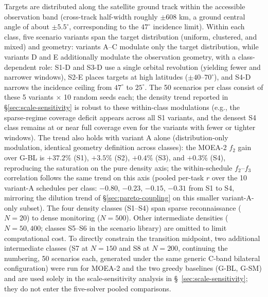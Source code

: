 \documentclass[preprint,12pt,authoryear]{elsarticle}
\begin{document}
Targets are distributed along the satellite ground track within the
accessible observation band (cross-track half-width roughly $\pm 608$ km,
a ground central angle of about $\pm 5.5^\circ$, corresponding to the
$47^\circ$ incidence limit). Within each class, five scenario variants
span the target distribution (uniform, clustered, and mixed) and geometry:
variants A--C modulate only the target distribution, while variants D and E
additionally modulate the observation geometry, with a class-dependent role:
S1-D and S3-D use a single orbital revolution (yielding fewer and narrower
windows), S2-E places targets at high latitudes ($\pm 40$--$70^\circ$), and
S4-D narrows the incidence ceiling from $47^\circ$ to $25^\circ$. The 50 scenarios per class consist of these 5 variants
$\times$ 10 random seeds each; the density trend reported in
\S\ref{sec:scale-sensitivity} is robust to these within-class modulations
(e.g., the sparse-regime coverage deficit appears across all S1 variants, and
the densest S4 class remains at or near full coverage even for the variants
with fewer or tighter windows). The trend also holds with variant A alone (distribution-only modulation,
identical geometry definition across classes): the MOEA-2 $f_2$
gain over G-BL is $+37.2\%$ (S1), $+3.5\%$ (S2), $+0.4\%$ (S3), and $+0.3\%$
(S4), reproducing the saturation on the pure density axis; the within-schedule
$f_2$--$f_3$ correlation follows the same trend on this axis (pooled per-task
$r$ over the 10 variant-A schedules per class: $-0.80$, $-0.23$, $-0.15$,
$-0.31$ from S1 to S4, mirroring the dilution trend of
\S\ref{sec:pareto-coupling} on this smaller variant-A-only subset). The four density
classes (S1--S4) span sparse reconnaissance ($N=20$) to dense monitoring
($N=500$). Other intermediate densities ($N=50, 400$; classes S5--S6 in the
scenario library) are omitted to limit computational cost. To directly
constrain the transition midpoint, two additional intermediate classes
(S7 at $N=150$ and S8 at $N=200$, continuing the numbering, 50 scenarios
each, generated under the same generic C-band bilateral configuration) were run for
MOEA-2 and the two greedy baselines (G-BL, G-SM) and are used solely in the
scale-sensitivity analysis in \S~\ref{sec:scale-sensitivity}; they do not enter
the five-solver pooled comparisons.
\end{document}
